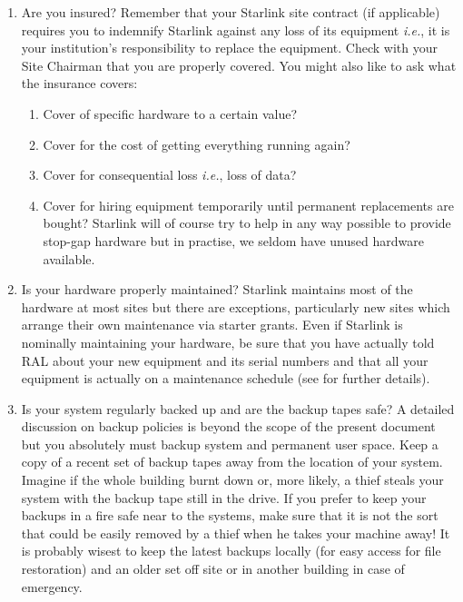 \begin{enumerate}

\item Are you insured? Remember that your Starlink site contract (if
applicable) requires you to indemnify Starlink against any loss of
its equipment \emph{i.e.}, it is your institution's responsibility to
replace the equipment. Check with your Site Chairman that you are
properly covered.  You might also like to ask what the insurance
covers:

\begin{enumerate}

\item Cover of specific hardware to a certain value?

\item Cover for the cost of getting everything running again?

\item Cover for consequential loss \emph{i.e.}, loss of data?

\item Cover for hiring equipment temporarily until permanent replacements
are bought? Starlink will of course try to help in any way possible to 
provide stop-gap hardware but in practise, we seldom have unused hardware
available.

\end{enumerate}

\item Is your hardware properly maintained? Starlink maintains most of
the hardware at most sites but there are exceptions, particularly
new sites which arrange their own maintenance via starter grants. 
Even if Starlink is nominally maintaining your hardware, be sure that
you have actually told RAL about your new equipment and its serial numbers
and that all your equipment is actually on a maintenance schedule 
(see  for further details). 


\item Is your system regularly backed up and are the backup tapes
safe?  A detailed discussion on backup policies is beyond the scope of
the present document but you absolutely must backup
system and permanent user space. Keep a copy of a recent set of backup
tapes away from the location of your system. Imagine if the whole
building burnt down or, more likely, a thief steals your system with
the backup tape still in the drive. If you prefer to keep your backups
in a fire safe near to the systems, make sure that it is not the sort
that could be easily removed by a thief when he takes your machine away!
It is probably wisest to keep the latest backups locally (for easy access
for file restoration) and an older set off site or in another building
in case of emergency.


\end{enumerate}
